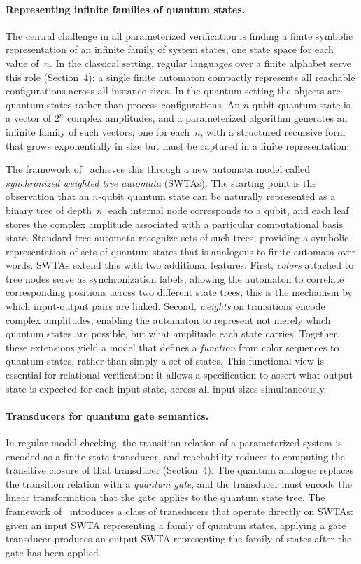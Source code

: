 \paragraph{Representing infinite families of quantum states.}
The central challenge in all parameterized verification is finding a finite
symbolic representation of an infinite family of system states, one state
space for each value of~$n$. In the classical setting, regular languages over
a finite alphabet serve this role (Section~4): a single finite automaton
compactly represents all reachable configurations across all instance sizes.
In the quantum setting the objects are quantum states rather than process
configurations. An $n$-qubit quantum state is a vector of $2^n$ complex
amplitudes, and a parameterized algorithm generates an infinite family of
such vectors, one for each~$n$, with a structured recursive form that grows
exponentially in size but must be captured in a finite representation.

The framework of~\cite{AutoQPara} achieves this through a new automata model
called \emph{synchronized weighted tree automata} (SWTAs). The starting point
is the observation that an $n$-qubit quantum state can be naturally represented
as a binary tree of depth~$n$: each internal node corresponds to a qubit, and
each leaf stores the complex amplitude associated with a particular
computational basis state. Standard tree automata recognize sets of such
trees, providing a symbolic representation of sets of quantum states that is
analogous to finite automata over words. SWTAs extend this with two additional
features. First, \emph{colors} attached to tree nodes serve as synchronization
labels, allowing the automaton to correlate corresponding positions across two
different state trees; this is the mechanism by which input-output pairs are
linked. Second, \emph{weights} on transitions encode complex amplitudes,
enabling the automaton to represent not merely which quantum states are
possible, but what amplitude each state carries. Together, these extensions
yield a model that defines a \emph{function} from color sequences to quantum
states, rather than simply a set of states. This functional view is essential
for relational verification: it allows a specification to assert what output
state is expected for each input state, across all input sizes simultaneously.

\paragraph{Transducers for quantum gate semantics.}
In regular model checking, the transition relation of a parameterized system
is encoded as a finite-state transducer, and reachability reduces to computing
the transitive closure of that transducer (Section~4). The quantum analogue
replaces the transition relation with a \emph{quantum gate}, and the transducer
must encode the linear transformation that the gate applies to the quantum
state tree. The framework of~\cite{AutoQPara} introduces a class of transducers
that operate directly on SWTAs: given an input SWTA representing a family of
quantum states, applying a gate transducer produces an output SWTA representing
the family of states after the gate has been applied.

